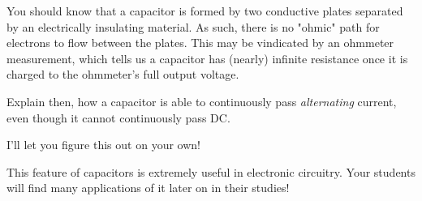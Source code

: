 

You should know that a capacitor is formed by two conductive plates separated by an electrically insulating material.  As such, there is no "ohmic" path for electrons to flow between the plates.  This may be vindicated by an ohmmeter measurement, which tells us a capacitor has (nearly) infinite resistance once it is charged to the ohmmeter's full output voltage.

Explain then, how a capacitor is able to continuously pass {\it alternating} current, even though it cannot continuously pass DC.







I'll let you figure this out on your own!







This feature of capacitors is extremely useful in electronic circuitry.  Your students will find many applications of it later on in their studies!




